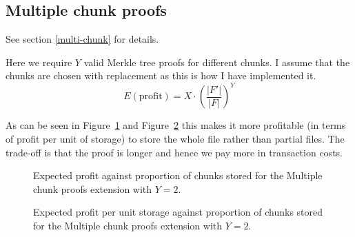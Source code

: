 \documentclass[12pt,a4paper,twoside,openright]{report}
\begin{document}
\subsection{Multiple chunk proofs}

See section \ref{multi-chunk} for details.

Here we require $Y$ valid Merkle tree proofs for different chunks.
I assume that the chunks are chosen with replacement as this is how I have implemented it.
\[E(\text{profit}) = X \cdot \left(\frac{|F'|}{|F|}\right)^Y\]

As can be seen in Figure~\ref{fig:eval-graph-multi} and Figure~\ref{fig:eval-graph-multi-storage} this makes it more profitable (in terms of profit per unit of storage)
to store the whole file rather than partial files. The trade-off is that the proof is longer and hence we pay more in transaction costs.

\begin{figure}[H]
\caption[Expected attacker profit: multiple chunk proofs]{Expected profit against proportion of chunks stored for the Multiple chunk proofs extension with $Y = 2$.}
\label{fig:eval-graph-multi}
\end{figure}

\begin{figure}[H]
\caption[Expected attacker profit per unit storage: multiple chunk proofs]{Expected profit per unit storage against proportion of chunks stored for the Multiple chunk proofs extension with $Y = 2$.}
\label{fig:eval-graph-multi-storage}
\end{figure}
\end{document}

